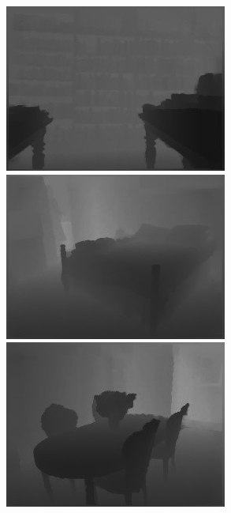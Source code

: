 \begin{figure}[htb]
\begin{subfigure}{0.24\linewidth}
\begin{minipage}[b]{1\linewidth}
  \includegraphics[width=1\linewidth]{figure/Pixel_cla_nyu/3gt.jpg}\vspace{4pt}
  \includegraphics[width=1\linewidth]{figure/Pixel_cla_nyu/4gt.jpg}\vspace{4pt}
  \includegraphics[width=1\linewidth]{figure/Pixel_cla_nyu/5gt.jpg}

\end{minipage}
\end{subfigure}
\end{figure}
